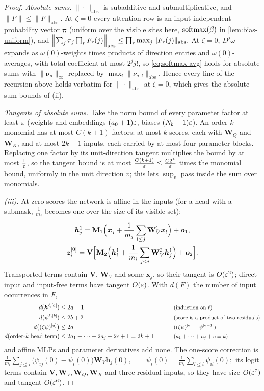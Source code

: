\begin{proof}
\emph{Absolute sums.} $\|\cdot\|_{\mathrm{abs}}$ is subadditive and submultiplicative, and $\|F\|\le\|F\|_{\mathrm{abs}}$. At $\zeta=0$ every attention row is an
input-independent probability vector $\bm\pi$ (uniform over the visible sites here, $\operatorname{softmax}(\beta)$ in \cref{lem:bias-uniform}), and
 $\Bigl\|\textstyle\sum_j\pi_j\prod_rF_r(j)\Bigr\|_{\mathrm{abs}}\le\prod_r\max_j\|F_r(j)\|_{\mathrm{abs}} .$ 
At $\zeta=0$, $D^j\omega$ expands as $\omega(0)$-weights times products of direction entries and $\omega(0)$-averages, with total coefficient at most $2^jj!$,
so \cref{eq:softmax-avg} holds for absolute sums with $\|\bm\nu_a\|_\infty$ replaced by $\max_l\|\nu_{a,l}\|_{\mathrm{abs}}$. Hence every line of the recursion
above holds verbatim for $\|\cdot\|_{\mathrm{abs}}$ at $\zeta=0$, which gives the absolute-sum bounds of (ii).

\emph{Tangents of absolute sums.} Take the norm bound of every parameter factor at least $\varepsilon$ (weights and embeddings $(a_0+1)\varepsilon$,
biases $(N_b+1)\varepsilon$). An order-$k$ monomial has at most $C(k+1)$ factors: at most $k$ scores, each with $\mathbf W_Q$ and $\mathbf W_K$, and at
most $2k+1$ inputs, each carried by at most four parameter blocks. Replacing one factor by its unit-direction tangent multiplies the bound by at
most $\frac{1}{\varepsilon}$, so the tangent bound is at most $\frac{C(k+1)}{\varepsilon}\le\frac{C2^k}{\varepsilon}$ times the monomial bound, uniformly in the unit direction
$v$; this lets $\sup_v$ pass inside the sum over monomials.

\emph{(iii).} At zero scores the network is affine in the inputs (for a head with a submask, $\frac{1}{m_j}$ becomes one over the size of its
visible set):
\begin{gather*}
 \bm h^1_j=\mathbf M_1\Bigl(\bm x_j+\frac{1}{m_j}\sum_{l\le j}\mathbf W^1_V\bm x_l\Bigr)+\bm o_1,\\
 \bm z^{[0]}_i=\mathbf V\Bigl[\mathbf M_2\Bigl(\bm h^1_i+\frac{1}{m_i}\sum_{j\le i}\mathbf W^2_V\bm h^1_j\Bigr)+\bm o_2\Bigr].
\end{gather*}
Transported terms contain $\mathbf V$, $\mathbf W_V$ and some $\bm x_j$, so their tangent is $O(\varepsilon^2)$; direct-input and input-free terms have tangent $O(\varepsilon)$.
With $d(F)$ the number of input occurrences in $F$,
\begin{alignat*}{2}
 d(\bm h^{\ell,[a]})&\le2a+1 &\qquad& \why{induction on $\ell$}\\
 d(\psi^{\ell,[b]})&\le2b+2 && \why{score is a product of two residuals}\\
 d\bigl((\zeta\psi)^{[a]}\bigr)&\le2a && \why{$(\zeta\psi)^{[a]}=\psi^{[a-1]}$}\\
 d(\text{order-$k$ head term})&\le2a_1+\cdots+2a_j+2c+1=2k+1 && \why{$a_1+\cdots+a_j+c=k$}
\end{alignat*}
and affine MLPs and parameter derivatives add none. The one-score correction is
 $\frac{1}{m_i}\sum_{j\le i}\bigl(\psi_{ij}(0)-\bar\psi_i(0)\bigr)\mathbf W_V\bm h_j(0),\qquad \bar\psi_i(0)=\frac{1}{m_i}\sum_{l\le i}\psi_{il}(0);$ 
its logit terms contain $\mathbf V,\mathbf W_V,\mathbf W_Q,\mathbf W_K$ and three residual inputs, so they have size $O(\varepsilon^7)$ and tangent $O(\varepsilon^6)$.


\end{proof}
